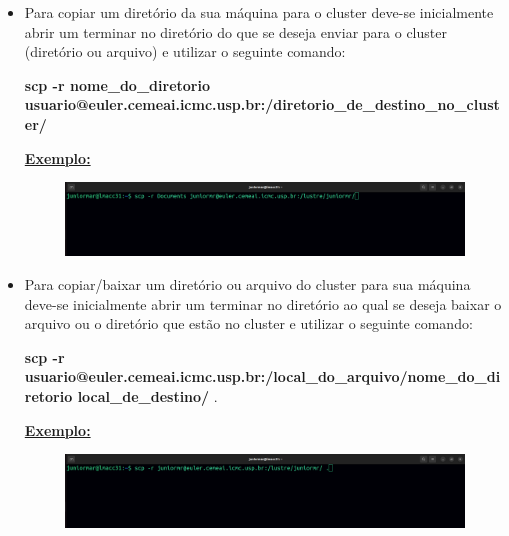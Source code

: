 \documentclass[12pt]{article}
\begin{document}
\begin{itemize}
	\item Para copiar um diretório da sua máquina para o cluster deve-se inicialmente abrir um terminar no diretório do que se deseja enviar para o cluster (diretório ou arquivo) e utilizar o seguinte comando:
	
	\hspace{-1.7cm}
	\textbf{scp -r nome\_do\_diretorio usuario@euler.cemeai.icmc.usp.br:/diretorio\_de\_destino\_no\_cluster/}
	
	\textbf{\underline{Exemplo:}}
    \begin{figure}[htb]
    	\centering
    	\includegraphics[trim = 0mm 70mm 160mm 0mm,clip,width=1.05\linewidth]{figures/send.png}
    	\label{fig:send}
    \end{figure}
	\item Para copiar/baixar um diretório ou arquivo do cluster para sua máquina deve-se inicialmente abrir um terminar no diretório ao qual se deseja baixar o arquivo ou o diretório que estão no cluster e utilizar o seguinte comando:
	
	\hspace{-1.7cm}
	\textbf{scp -r usuario@euler.cemeai.icmc.usp.br:/local\_do\_arquivo/nome\_do\_diretorio local\_de\_destino/$\mbox{  .}$}
	
	\textbf{\underline{Exemplo:}}
	\begin{figure}[htb]
		\centering
		\includegraphics[trim = 0mm 70mm 190mm 0mm,clip,width=1.05\linewidth]{figures/download.png}
		\label{fig:recive}
	\end{figure}
	

\end{itemize}
\end{document}
